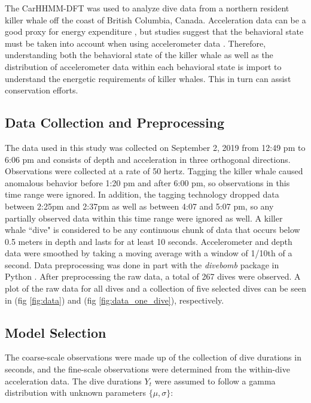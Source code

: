 

The CarHHMM-DFT was used to analyze dive data from a northern resident killer whale off the coast of British Columbia, Canada. Acceleration data can be a good proxy for energy expenditure \citep{Green:2009}, but studies suggest that the behavioral state must be taken into account when using accelerometer data \citep{Dot:2016}. Therefore, understanding both the behavioral state of the killer whale as well as the distribution of accelerometer data within each behavioral state is import to understand the energetic requirements of killer whales. This in turn can assist conservation efforts.

\subsection{Data Collection and Preprocessing}

The data used in this study was collected on September 2, 2019 from 12:49 pm to 6:06 pm and consists of depth and acceleration in three orthogonal directions. Observations were collected at a rate of 50 hertz. Tagging the killer whale caused anomalous behavior before 1:20 pm and after 6:00 pm, so observations in this time range were ignored. In addition, the tagging technology dropped data between 2:25pm and 2:37pm as well as between 4:07 and 5:07 pm, so any partially observed data within this time range were ignored as well. A killer whale ``dive" is considered to be any continuous chunk of data that occurs below 0.5 meters in depth and lasts for at least 10 seconds. Accelerometer and depth data were smoothed by taking a moving average with a window of 1/10th of a second. Data preprocessing was done in part with the \textit{divebomb} package in Python \citep{Nunes:2018}. After preprocessing the raw data, a total of 267 dives were observed. A plot of the raw data for all dives and a collection of five selected dives can be seen in (fig \ref{fig:data}) and (fig \ref{fig:data_one_dive}), respectively.

\subsection{Model Selection}

The coarse-scale observations were made up of the collection of dive durations in seconds, and the fine-scale observations were determined from the within-dive acceleration data. The dive durations $Y_t$ were assumed to follow a gamma distribution with unknown parameters $\{\mu,\sigma\}$:

